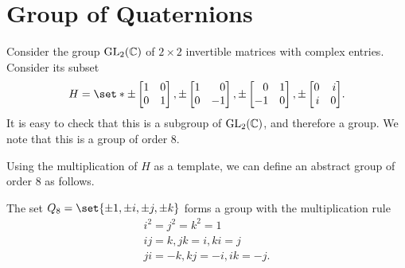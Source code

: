 \documentclass[11pt]{penrose}
\begin{document}
\section{Group of Quaternions}
Consider the group $\mathrm{GL}_2(\mathbb{C})$ of $2 \times 2$ invertible matrices with complex entries. Consider its subset
\begin{equation}
    H = \set*{
    \pm\begin{bmatrix*}[r]1 & 0\\ 0 & 1\end{bmatrix*},
    \pm\begin{bmatrix*}[r]1 & 0\\ 0 &-1\end{bmatrix*},
    \pm\begin{bmatrix*}[r]0 & 1\\-1 & 0\end{bmatrix*},
    \pm\begin{bmatrix*}[r]0 & i\\ i & 0\end{bmatrix*} }.
\end{equation}
It is easy to check that this is a subgroup of $\mathrm{GL}_2(\mathbb{C})$, and therefore a group. We note that this is a group of order $8$.

Using the multiplication of $H$ as a template, we can define an abstract group of order $8$ as follows.
\begin{nthm}
    The set $Q_8 = \set{\pm 1, \pm i, \pm j, \pm k}$ forms a group with the multiplication rule
    \begin{gather}
        i^2 = j^2 = k^2 = 1\\
        ij = k, jk = i, ki = j\\
        ji = -k, kj = -i, ik = -j.
    \end{gather}
\end{nthm}
\end{document}
